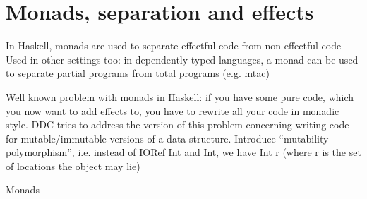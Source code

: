 \section{Monads, separation and effects}\label{sec:monads}

In Haskell, monads are used to separate effectful code from non-effectful code
Used in other settings too: in dependently typed languages, a monad can be used to separate partial programs from total programs (e.g. mtac)

Well known problem with monads in Haskell: if you have some pure code, which you now want to add effects to, you have to rewrite all your code in monadic style.
	DDC tries to address the version of this problem concerning writing code for mutable/immutable versions of a data structure. Introduce ``mutability polymorphism'', i.e. instead of IORef Int and Int, we have Int r (where r is the set of locations the object may lie)

	Monads
